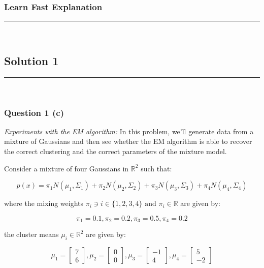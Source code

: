 \documentclass{article}
\begin{document}
\subsubsection*{Learn Fast Explanation}

\noindent\rule{\textwidth}{0.4pt}\\

\newpage

\subsection*{Solution 1}
\noindent\rule{\textwidth}{0.4pt}\\
\subsubsection*{Question 1 (c)}
\begin{flushleft}
\textit{Experiments with the EM algorithm:} In this problem, we'll generate data from a mixture of Gaussians and then see whether the EM algorithm is able to recover the correct clustering and the correct parameters of the mixture model.
\end{flushleft}
\begin{flushleft}
    Consider a mixture of four Gaussians in $\mathbb{R}^2$ such that:
\end{flushleft}
$$p(x) = \pi_1 N(\mu_1, \Sigma_1) + \pi_2 N(\mu_2, \Sigma_2) + \pi_3 N(\mu_3, \Sigma_3) + \pi_4 N(\mu_4, \Sigma_4)$$
\begin{flushleft}
    where the mixing weights $\pi_i \ni i \in \{1,2,3,4\} \text{ and } \pi_i \in \mathbb{R}$ are given by:
\end{flushleft}
$$\pi_1 = 0.1, \pi_2 = 0.2, \pi_3 = 0.5, \pi_4 = 0.2$$
\begin{flushleft}
    the cluster means $\mu_i \in \mathbb{R}^2$ are given by:
\end{flushleft}
$$\mu_1 = \begin{bmatrix}7 \\ 6\end{bmatrix}, \mu_2 = \begin{bmatrix}0 \\ 0\end{bmatrix}, \mu_3 = \begin{bmatrix}-1 \\ 4\end{bmatrix}, \mu_4 = \begin{bmatrix}5 \\ -2\end{bmatrix}$$
\end{document}
